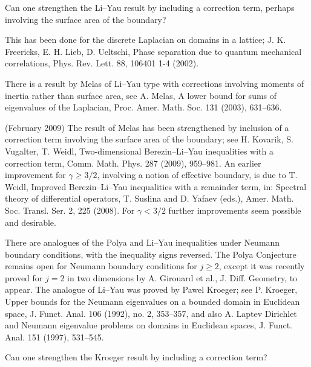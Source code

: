\documentclass[12pt,letterpaper, reqno]{amsart}
\begin{document}
\begin{problemblock}


\begin{problem}[1.2] 
Can one strengthen the Li--Yau result by
including a correction term, perhaps involving the surface area of
the boundary?
\end{problem}

\begin{distinguishedremark}
This has been done for the discrete
Laplacian on domains in a lattice; J. K. Freericks, E. H. Lieb, D. Ueltschi, Phase separation due to quantum mechanical correlations, Phys. Rev. Lett. 88, 106401 1-4 (2002).
\end{distinguishedremark}

\begin{remark}
There is a result by Melas of Li--Yau type with
corrections involving moments of inertia rather than surface
area, see A. Melas, A lower bound for sums of eigenvalues of the Laplacian,
Proc. Amer. Math. Soc. 131 (2003), 631--636.
\end{remark}

\begin{remark}
(February 2009) The result of Melas has been strengthened by inclusion
of a correction term involving the surface area of the boundary; see
H. Kovarik, S. Vugalter, T. Weidl, Two-dimensional Berezin--Li--Yau
inequalities with a correction term, Comm. Math. Phys. 287 (2009),
959--981. An earlier improvement for $\gamma\geq 3/2$, involving
a notion of effective boundary, is due to T. Weidl, Improved
Berezin--Li--Yau inequalities with a remainder term, in: Spectral
theory of differential operators, T. Suslina and D. Yafaev (eds.),
Amer. Math. Soc. Transl. Ser. 2, 225 (2008). For $\gamma<3/2$ further
improvements seem possible and desirable.
\end{remark}

\end{problemblock}


\begin{problemblock}

There are analogues of the Polya and Li--Yau inequalities under
Neumann boundary conditions, with the inequality signs reversed. The Polya Conjecture
remains open for Neumann boundary conditions for $j \geq 2$, except it was recently proved for $j=2$ in two dimensions by A. Girouard et al., J. Diff. Geometry, to appear. The analogue
of Li--Yau was proved by Pawel Kroeger; see P. Kroeger, Upper bounds for the Neumann eigenvalues on a bounded domain in Euclidean space, J. Funct. Anal.  106  (1992),  no. 2, 353--357, and also A. Laptev Dirichlet and Neumann
eigenvalue problems on domains in Euclidean spaces, J. Funct. Anal.
151 (1997), 531--545. 

\begin{problem}[1.3]  
Can one strengthen the Kroeger result by including a correction term?

\end{problem}

\end{problemblock}
\end{document}
